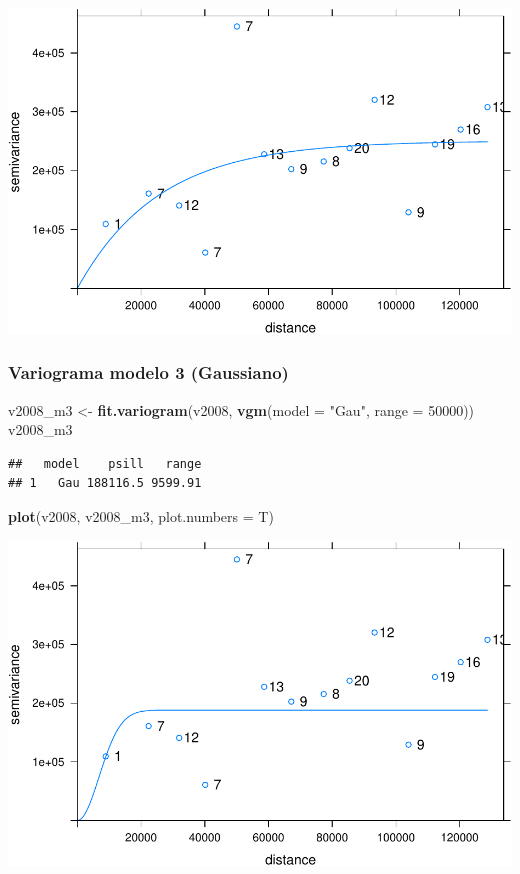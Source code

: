 \documentclass[11pt,]{article}
\newenvironment{Shaded}{\begin{snugshade}}{\end{snugshade}}
\newcommand{\KeywordTok}[1]{\textcolor[rgb]{0.13,0.29,0.53}{\textbf{#1}}}
\newcommand{\DataTypeTok}[1]{\textcolor[rgb]{0.13,0.29,0.53}{#1}}
\newcommand{\DecValTok}[1]{\textcolor[rgb]{0.00,0.00,0.81}{#1}}
\newcommand{\StringTok}[1]{\textcolor[rgb]{0.31,0.60,0.02}{#1}}
\newcommand{\NormalTok}[1]{#1}
\begin{document}
\includegraphics{proyecto_files/figure-latex/unnamed-chunk-33-1.pdf}

\subsubsection{Variograma modelo 3
(Gaussiano)}\label{variograma-modelo-3-gaussiano}

\begin{Shaded}
\begin{Highlighting}[]
\NormalTok{v2008_m3 <-}\StringTok{ }\KeywordTok{fit.variogram}\NormalTok{(v2008, }\KeywordTok{vgm}\NormalTok{(}\DataTypeTok{model =} \StringTok{"Gau"}\NormalTok{, }\DataTypeTok{range =} \DecValTok{50000}\NormalTok{))}
\NormalTok{v2008_m3}
\end{Highlighting}
\end{Shaded}

\begin{verbatim}
##   model    psill   range
## 1   Gau 188116.5 9599.91
\end{verbatim}

\begin{Shaded}
\begin{Highlighting}[]
\KeywordTok{plot}\NormalTok{(v2008, v2008_m3, }\DataTypeTok{plot.numbers =}\NormalTok{ T)}
\end{Highlighting}
\end{Shaded}

\includegraphics{proyecto_files/figure-latex/unnamed-chunk-34-1.pdf}
\end{document}
